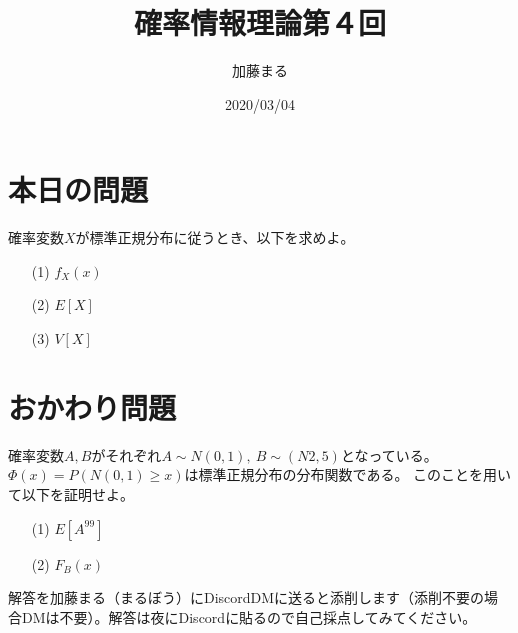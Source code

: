 \documentclass[a4j,uplatex]{jsarticle}
\title{確率情報理論第４回}
\author{加藤まる}
\date{2020/03/04}
\begin{document}
\maketitle

\section*{本日の問題}
確率変数$X$が標準正規分布に従うとき、以下を求めよ。
\begin{itemize}
  \item[(1)] $f_X(x)$
  \item[(2)] $E[X]$
  \item[(3)] $V[X]$
\end{itemize}


\section*{おかわり問題}
確率変数$A,B$がそれぞれ$A\sim N(0,1),~B\sim (N2,5)$となっている。$\Phi (x)=P(N(0,1)\ge x)$は標準正規分布の分布関数である。
このことを用いて以下を証明せよ。
\begin{itemize}
  \item[(1)] $E[A^{99}]$ 
  \item[(2)] $F_B(x)$
\end{itemize}



解答を加藤まる（まるぼう）にDiscordDMに送ると添削します（添削不要の場合DMは不要）。解答は夜にDiscordに貼るので自己採点してみてください。
\end{document}
